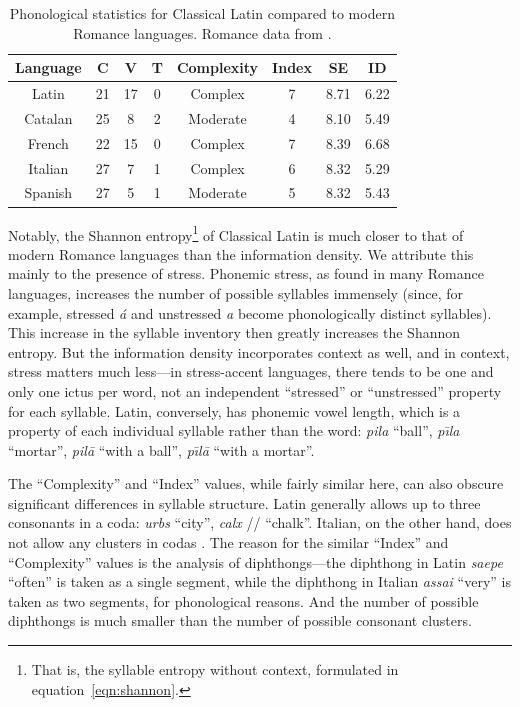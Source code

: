 \documentclass[12pt,twoside]{article}
\newcommand{\ipa}[1]{/\textipa{#1}/}
\begin{document}
\begin{table}[h]
\centering
\begin{tabular}{|c|c|c|c|c|c|c|c|}
\hline
\textbf{Language} & \textbf{C} & \textbf{V} & \textbf{T} & \textbf{Complexity} & \textbf{Index} & \textbf{SE} & \textbf{ID} \\\hline
Latin & 21 & 17 & 0 & Complex & 7 & 8.71 & 6.22 \\\hline
Catalan & 25 & 8 & 2 & Moderate & 4 & 8.10 & 5.49 \\\hline
French & 22 & 15 & 0 & Complex & 7 & 8.39 & 6.68 \\\hline
Italian & 27 & 7 & 1 & Complex & 6 & 8.32 & 5.29 \\\hline
Spanish & 27 & 5 & 1 & Moderate & 5 & 8.32 & 5.43 \\\hline
\end{tabular}
\caption{Phonological statistics for Classical Latin compared to modern Romance languages. Romance data from \cite[44-45]{oh}.}
\label{tab:phono}
\end{table}

Notably, the Shannon entropy\footnote{That is, the syllable entropy without context, formulated in equation~\ref{eqn:shannon}.} of Classical Latin is much closer to that of modern Romance languages than the information density. We attribute this mainly to the presence of stress. Phonemic stress, as found in many Romance languages, increases the number of possible syllables immensely (since, for example, stressed \emph{\'a} and unstressed \emph{a} become phonologically distinct syllables). This increase in the syllable inventory then greatly increases the Shannon entropy. But the information density incorporates context as well, and in context, stress matters much less---in stress-accent languages, there tends to be one and only one ictus per word, not an independent ``stressed'' or ``unstressed'' property for each syllable. Latin, conversely, has phonemic vowel length, which is a property of each individual syllable rather than the word: \emph{pila} ``ball'', \emph{p\=\i{}la} ``mortar'', \emph{pil\=a} ``with a ball'', \emph{p\=\i{}l\=a} ``with a mortar''.

The ``Complexity'' and ``Index'' values, while fairly similar here, can also obscure significant differences in syllable structure. Latin generally allows up to three consonants in a coda: \emph{urbs} ``city'', \emph{calx} \ipa{calks} ``chalk''. Italian, on the other hand, does not allow any clusters in codas \citep{hall}. The reason for the similar ``Index'' and ``Complexity'' values is the analysis of diphthongs---the diphthong in Latin \emph{saepe} ``often'' is taken as a single segment, while the diphthong in Italian \emph{assai} ``very'' is taken as two segments, for phonological reasons. And the number of possible diphthongs is much smaller than the number of possible consonant clusters.
\end{document}
